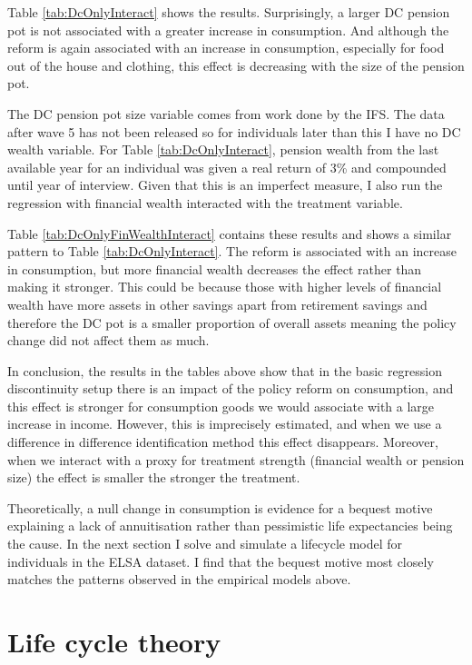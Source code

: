 \documentclass[12pt]{article}
\begin{document}
Table \ref{tab:DcOnlyInteract} shows the results. Surprisingly, a larger DC
pension pot is not associated with a greater increase in consumption. And
although the reform is again associated with an increase in consumption,
especially for food out of the house and clothing, this effect is decreasing
with the size of the pension pot.

The DC pension pot size variable comes from work done by the IFS. The data after
wave 5 has not been released so for individuals later than this I have no DC
wealth variable. For Table \ref{tab:DcOnlyInteract}, pension wealth from the
last available year for an individual was given a real return of 3\% and
compounded until year of interview. Given that this is an imperfect measure, I
also run the regression with financial wealth interacted with the treatment
variable.

Table \ref{tab:DcOnlyFinWealthInteract} contains these results and shows a
similar pattern to Table \ref{tab:DcOnlyInteract}. The reform is associated with
an increase in consumption, but more financial wealth decreases the effect
rather than making it stronger. This could be because those with higher levels
of financial wealth have more assets in other savings apart from retirement
savings \cite{cribb_karjalainen_ifs_2023} and therefore the DC pot is a smaller
proportion of overall assets meaning the policy change did not affect them as
much.

In conclusion, the results in the tables above show that in the basic regression
discontinuity setup there is an impact of the policy reform on consumption, and
this effect is stronger for consumption goods we would associate with a large
increase in income. However, this is imprecisely estimated, and when we use a
difference in difference identification method this effect disappears. Moreover,
when we interact with a proxy for treatment strength (financial wealth or
pension size) the effect is smaller the stronger the treatment.

Theoretically, a null change in consumption is evidence for a bequest motive
explaining a lack of annuitisation rather than pessimistic life expectancies
being the cause. In the next section I solve and simulate a lifecycle model for
individuals in the ELSA dataset. I find that the bequest motive most closely
matches the patterns observed in the empirical models above.

\section{Life cycle theory}
\end{document}
